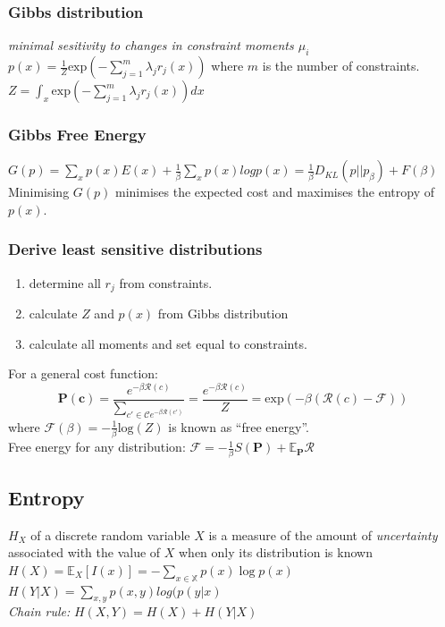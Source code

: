 \documentclass[9pt,parskip]{scrartcl}
\begin{document}
\begin{multicols*}{4}
\subsubsection*{Gibbs distribution}
\textit{minimal sesitivity to changes in constraint moments $\mu_i$} \\
$p(x) = \frac 1 Z \text{exp}(- \sum_{j=1}^m \lambda_j r_j(x))$ where $m$ is the number of constraints. \\

$Z = \int_x \text{exp}(- \sum_{j=1}^m \lambda_j r_j(x)) dx$
\subsubsection*{Gibbs Free Energy}
$G(p) = \sum_x p(x) E(x) + \frac{1}{\beta} \sum_x p(x)log p(x) = \frac{1}{\beta} D_{KL}(p||p_{\beta}) + F(\beta)$
Minimising $G(p)$ minimises the expected cost and maximises the entropy of $p(x)$.
\subsubsection*{Derive least sensitive distributions}
\begin{enumerate}
	\item determine all $r_j$ from constraints.
	\item calculate $Z$ and $p(x)$ from Gibbs distribution
	\item calculate all moments and set equal to constraints.
\end{enumerate}

For a general cost function:
\[\mathbf{P}(\mathbf{c}) = \frac{e^{-\beta \mathcal{R}(c)}}{\sum_{c' \in \mathcal{C} e^{-\beta \mathcal{R}(c')}}} = \frac{e^{-\beta \mathcal{R}(c)}}{Z} = \text{exp}(- \beta (\mathcal{R}(c)- \mathcal{F})) \]
where $\mathcal{F}(\beta) = -\frac 1 \beta \text{log}(Z)$ is known as "`free energy"'. \\
Free energy for any distribution: $\mathcal{F} = - \frac 1 \beta S(\mathbf{P}) + \mathbb{E}_{\mathbf{P}} \mathcal{R} $
\subsection*{Entropy}
$H_X$ of a discrete random variable $X$ is a measure of the amount of \textit{uncertainty} associated with the value of $X$ when only its distribution is known \\
$H(X)=\mathbb {E} _{X}[I(x)]=-\sum _{x\in \mathbb {X} }p(x)\log p(x)$ \\
$H(Y|X) = \sum_{x,y} p(x,y)log(p(y|x)$\\
\textit{Chain rule: } $ H(X,Y) = H(X) + H(Y|X) $ \\


\end{multicols*}
\end{document}
